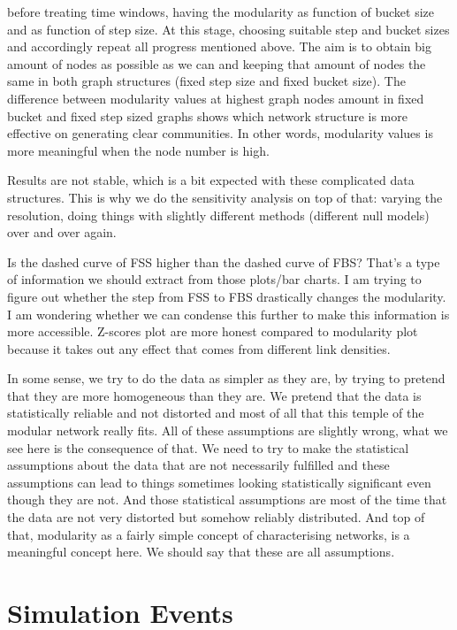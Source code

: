 {	before treating time windows, having the modularity as function of bucket size and as function of step size. At this stage, choosing suitable step and bucket sizes and accordingly repeat all progress mentioned above. The aim is to obtain big amount of nodes as possible as we can and keeping that amount of nodes the same in both graph structures (fixed step size and fixed bucket size). The difference between modularity values at highest graph nodes amount in fixed bucket and fixed step sized graphs shows which network structure is more effective on generating clear communities. In other words, modularity values is more meaningful when the node number is high.
	
	Results are not stable, which is a bit expected with these complicated data structures. This is why we do the sensitivity analysis on top of that: varying the resolution, doing things with slightly different methods (different null models) over and over again.
	
	Is the dashed curve of FSS higher than the dashed curve of FBS? That's a type of information we should extract from those plots/bar charts.
	I am trying to figure out whether the step from FSS to FBS drastically changes the modularity. I am wondering whether we can condense this further to make this information is more accessible.
	Z-scores plot are more honest compared to modularity plot because it takes out any effect that comes from different link densities.
	
	In some sense, we try to do the data as simpler as they are, by trying to pretend that they are more homogeneous than they are. We pretend that the data is statistically reliable and not distorted and most of all that this temple of the modular network really fits. All of these assumptions are slightly wrong, what we see here is the consequence of that. We need to try to make the statistical assumptions about the data that are not necessarily fulfilled and these assumptions can lead to things sometimes looking statistically significant even though they are not. And those statistical assumptions are most of the time that the data are not very distorted but somehow reliably distributed. And top of that, modularity as a fairly simple concept of characterising networks, is a meaningful concept here. We should say that these are all assumptions.
}
\clearpage

\section{Simulation Events}
